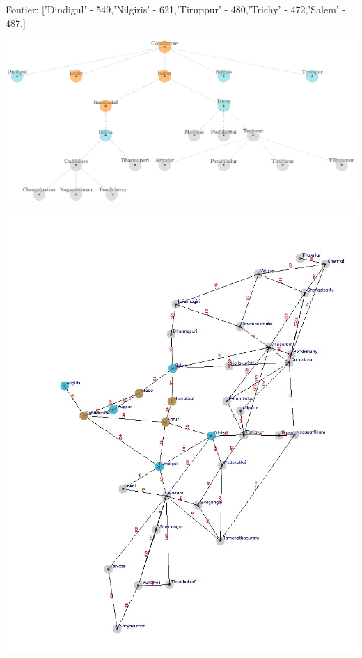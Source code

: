 \documentclass[xcolor=table]{beamer}
\begin{document}
\begin{frame}
  { \tiny Fontier: ['Dindigul' - 549,'Nilgiris' - 621,'Tiruppur' - 480,'Trichy' - 472,'Salem' - 487,]}
  \begin{center}
  \includegraphics[height=0.35\textheight]{../AStarNode/6-1.png}
  \end{center}
  \begin{center}
    \includegraphics[height=0.55\textheight]{../AStaroutput/tamilAStar4.jpg}
  \end{center}
\end{frame}
\end{document}
